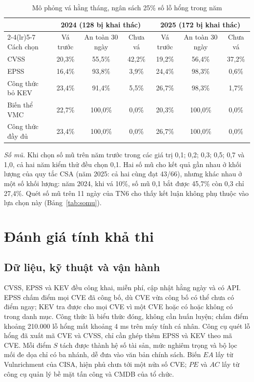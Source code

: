 \documentclass[conference]{IEEEtran}
\begin{document}
\begin{table}[t]
\caption{Mô phỏng vá hằng tháng, ngân sách 25\% số lỗ hổng trong năm}\label{tab:mophong}
\centering
\begin{tabular}{lcccccc}
\toprule
 & \multicolumn{3}{c}{2024 (128 bị khai thác)} & \multicolumn{3}{c}{2025 (172 bị khai thác)} \\
\cmidrule(lr){2-4}\cmidrule(lr){5-7}
Cách chọn & Vá trước & An toàn 30 ngày & Chưa vá & Vá trước & An toàn 30 ngày & Chưa vá \\
\midrule
CVSS             & 20,3\% & 55,5\%  & 42,2\% & 19,2\% & 56,4\%  & 37,2\% \\
EPSS             & 16,4\% & 93,8\%  & 3,9\%  & 24,4\% & 98,3\%  & 0,6\% \\
Công thức bỏ KEV & 23,4\% & 91,4\%  & 5,5\%  & 26,7\% & 98,3\%  & 1,7\% \\
Biến thể VMC     & 22,7\% & 100,0\% & 0,0\%  & 20,3\% & 100,0\% & 0,0\% \\
Công thức đầy đủ & 23,4\% & 100,0\% & 0,0\%  & 26,7\% & 100,0\% & 0,0\% \\
\bottomrule
\end{tabular}
\end{table}

\emph{Số mũ.} Khi chọn số mũ trên năm trước trong các giá trị 0,1; 0,2; 0,3; 0,5; 0,7 và 1,0, cả
hai năm kiểm thử đều chọn 0,1. Hai số mũ cho kết quả gần nhau ở khối lượng của quy tắc CSA (năm 2025: cả hai cùng đạt 43/66), nhưng khác nhau ở một số khối lượng: năm 2024, khi vá 10\%, số mũ 0,1 bắt được
45,7\% còn 0,3 chỉ 27,4\%. Quét số mũ trên 11 ngày của TN6 cho thấy kết luận không phụ thuộc vào lựa
chọn này (Bảng~\ref{tab:somu}).

\section{Đánh giá tính khả thi}\label{sec:khathi}

\subsection{Dữ liệu, kỹ thuật và vận hành}
CVSS, EPSS và KEV đều công khai, miễn phí, cập nhật hằng ngày và có API. EPSS chấm điểm mọi CVE đã công bố, dù CVE vừa công bố có thể chưa có điểm ngay; KEV tra được cho mọi CVE vì một CVE hoặc có hoặc không có trong danh mục. Công thức là biểu
thức đóng, không cần huấn luyện; chấm điểm khoảng 210.000 lỗ hổng mất khoảng 4 ms trên máy tính cá
nhân. Công cụ quét lỗ hổng đã xuất mã CVE và CVSS, chỉ cần ghép thêm EPSS và KEV theo mã CVE. Mỗi điểm $S$ tách được thành hệ số tài sản, mức nghiêm trọng và bộ lọc mối đe dọa chỉ có ba nhánh, dễ đưa vào văn bản chính sách. Biến $\mathit{EA}$ lấy từ Vulnrichment của CISA, hiện phủ chưa tới một nửa số CVE; $\mathit{PE}$ và $AC$ lấy từ công cụ quản lý bề mặt tấn công và CMDB của tổ chức.
\end{document}
